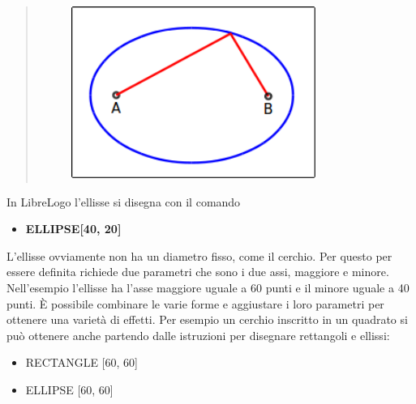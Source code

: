 \begin{quote}
\vskip 1cm

\begin{figure}[H]
   \centering
   \includegraphics[width=8.0cm,trim=4 4 8 4,clip]{./images/disegnare/disegnare-23.png}
   \label{dis-22}
\end{figure}

\vskip 1cm

\end{quote}

In LibreLogo l'ellisse si disegna con il comando

\vskip 1cm

\begin{scriptsize}
\begin{minipage}{0.40\textwidth}
\begin{itemize}[itemsep=-3pt,parsep=2pt]
\item[] \textbf{ELLIPSE[40, 20]}
\end{itemize}
\end{minipage}
\end{scriptsize}

\vskip 1cm

L'ellisse ovviamente non ha un diametro fisso, come il cerchio. Per questo per essere definita richiede due parametri che sono i due assi, maggiore e minore. Nell'esempio l'ellisse ha l'asse maggiore uguale a 60 punti e il minore uguale a 40 punti. È possibile combinare le varie forme e aggiustare i loro parametri per ottenere una varietà di effetti. Per esempio un cerchio inscritto in un quadrato si può ottenere anche partendo dalle istruzioni per disegnare rettangoli e ellissi:

\vskip 1cm

\begin{scriptsize}
\begin{minipage}{0.40\textwidth}
\begin{itemize}[itemsep=-3pt,parsep=2pt]
\item[] RECTANGLE [60, 60] 
\item[] ELLIPSE [60, 60]   
\end{itemize}
\end{minipage}
\end{scriptsize}

